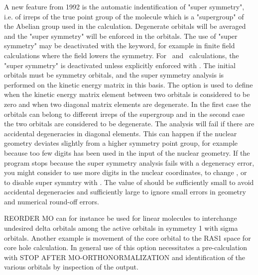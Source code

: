 A new feature from 1992 is the automatic indentification of "super
symmetry", i.e. of irreps of the true point group
of the molecule which 
is a "supergroup" of the Abelian group used in the calculation.
Degenerate orbitals will be averaged and the "super
symmetry" will be 
enforced in the orbitals.  The use of "super symmetry" may be
deactivated with the  keyword, for example in finite field
calculations where the field lowers the symmetry.
\ifabacus
For \aba\ and \resp\ calculations,
the "super symmetry" is deactivated unless explicitly enforced with
.
\fi
The initial orbitals must be symmetry orbitals, and the super symmetry 
analysis is performed on the kinetic energy matrix in this basis.
The  option is used to define when the
kinetic energy matrix element between two orbitals is considered to be zero 
and when two diagonal matrix elements are degenerate. In the first case
the orbitals can belong to different irreps of the supergroup
and in the second case the
two orbitals are considered to be degenerate.
The analysis will fail if there are accidental degeneracies
in diagonal elements.  This can happen
if the nuclear geometry deviates slightly from a higher symmetry point group,
for example because too few digits has been used in the input of the
nuclear geometry. If the program stops because the super symmetry analysis
fails with a degeneracy error, you might consider to use more digits
in the nuclear coordinates, to change , or to disable super
symmtry with .  The value of  should
be sufficiently small to avoid accidental degeneracies and
sufficiently large to ignore small errors in geometry and numerical
round-off errors.

 
REORDER MO can for instance be used for
linear molecules to interchange 
undesired delta orbitals among the active orbitals in symmetry 1 with
sigma orbitals.  Another example is movement of the core orbital to the
RAS1 space for core hole calculation.  In general use of this option
necessitates a pre-calculation with STOP AFTER MO-ORTHONORMALIZATION and
identification of the various orbitals by inspection of the output.
 
 
\pagebreak[3]
\subsection{\label{ref-popinp}}
 
